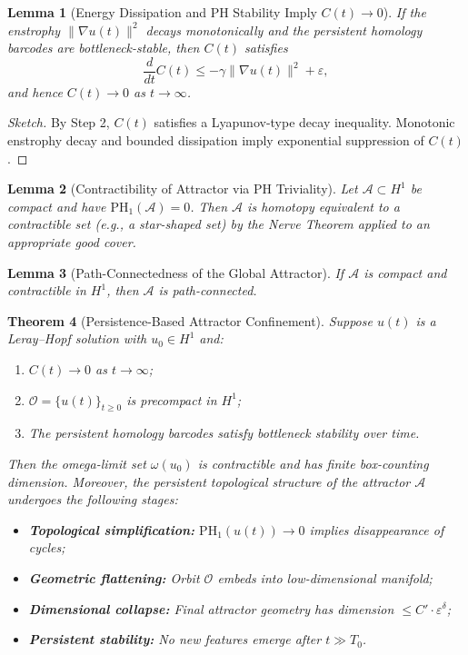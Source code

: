 \documentclass[11pt]{article}
\newtheorem{theorem}{Theorem}[section]
\newtheorem{lemma}[theorem]{Lemma}
\theoremstyle{definition}
\begin{document}
\begin{lemma}[Energy Dissipation and PH Stability Imply $C(t) \to 0$]
If the enstrophy $\|\nabla u(t)\|^2$ decays monotonically and the persistent homology barcodes are bottleneck-stable, then $C(t)$ satisfies
\[
\frac{d}{dt} C(t) \le -\gamma \|\nabla u(t)\|^2 + \varepsilon,
\]
and hence $C(t) \to 0$ as $t \to \infty$.
\end{lemma}

\begin{proof}[Sketch]
By Step 2, $C(t)$ satisfies a Lyapunov-type decay inequality. Monotonic enstrophy decay and bounded dissipation imply exponential suppression of $C(t)$.
\end{proof}

\begin{lemma}[Contractibility of Attractor via PH Triviality]
Let $\mathcal{A} \subset H^1$ be compact and have $\mathrm{PH}_1(\mathcal{A}) = 0$. Then $\mathcal{A}$ is homotopy equivalent to a contractible set (e.g., a star-shaped set) by the Nerve Theorem applied to an appropriate good cover.
\end{lemma}

\begin{lemma}[Path-Connectedness of the Global Attractor]
If $\mathcal{A}$ is compact and contractible in $H^1$, then $\mathcal{A}$ is path-connected.
\end{lemma}

\begin{theorem}[Persistence-Based Attractor Confinement]
\label{thm:attractor-confinement}
Suppose $u(t)$ is a Leray--Hopf solution with $u_0 \in H^1$ and:
\begin{enumerate}
  \item $C(t) \to 0$ as $t \to \infty$;
  \item $\mathcal{O} = \{ u(t) \}_{t \ge 0}$ is precompact in $H^1$;
  \item The persistent homology barcodes satisfy bottleneck stability over time.
\end{enumerate}
Then the omega-limit set $\omega(u_0)$ is contractible and has finite box-counting dimension. Moreover, the persistent topological structure of the attractor $\mathcal{A}$ undergoes the following stages:
\begin{itemize}
  \item \textbf{Topological simplification:} $\mathrm{PH}_1(u(t)) \to 0$ implies disappearance of cycles;
  \item \textbf{Geometric flattening:} Orbit $\mathcal{O}$ embeds into low-dimensional manifold;
  \item \textbf{Dimensional collapse:} Final attractor geometry has dimension $\le C' \cdot \varepsilon^{\delta}$;
  \item \textbf{Persistent stability:} No new features emerge after $t \gg T_0$.
\end{itemize}
\end{theorem}
\end{document}
